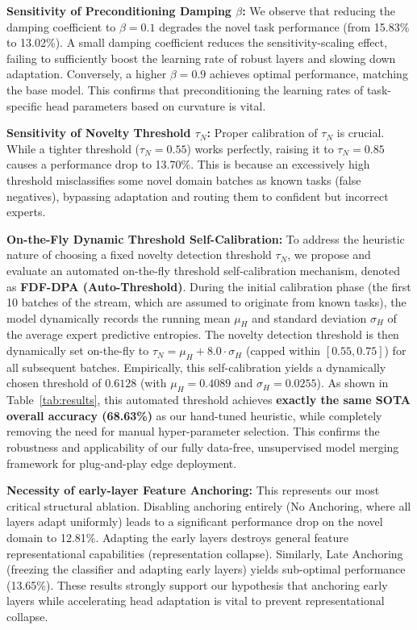 \documentclass{article}
\theoremstyle{plain}
\theoremstyle{definition}
\theoremstyle{remark}
\begin{document}
\textbf{Sensitivity of Preconditioning Damping $\beta$:} We observe that reducing the damping coefficient to $\beta = 0.1$ degrades the novel task performance (from 15.83\% to 13.02\%). A small damping coefficient reduces the sensitivity-scaling effect, failing to sufficiently boost the learning rate of robust layers and slowing down adaptation. Conversely, a higher $\beta = 0.9$ achieves optimal performance, matching the base model. This confirms that preconditioning the learning rates of task-specific head parameters based on curvature is vital.

\textbf{Sensitivity of Novelty Threshold $\tau_N$:} Proper calibration of $\tau_N$ is crucial. While a tighter threshold ($\tau_N = 0.55$) works perfectly, raising it to $\tau_N = 0.85$ causes a performance drop to 13.70\%. This is because an excessively high threshold misclassifies some novel domain batches as known tasks (false negatives), bypassing adaptation and routing them to confident but incorrect experts.

\textbf{On-the-Fly Dynamic Threshold Self-Calibration:} To address the heuristic nature of choosing a fixed novelty detection threshold $\tau_N$, we propose and evaluate an automated on-the-fly threshold self-calibration mechanism, denoted as \textbf{FDF-DPA (Auto-Threshold)}. During the initial calibration phase (the first 10 batches of the stream, which are assumed to originate from known tasks), the model dynamically records the running mean $\mu_H$ and standard deviation $\sigma_H$ of the average expert predictive entropies. The novelty detection threshold is then dynamically set on-the-fly to $\tau_N = \mu_H + 8.0 \cdot \sigma_H$ (capped within $[0.55, 0.75]$) for all subsequent batches. Empirically, this self-calibration yields a dynamically chosen threshold of $0.6128$ (with $\mu_H = 0.4089$ and $\sigma_H = 0.0255$). As shown in Table~\ref{tab:results}, this automated threshold achieves \textbf{exactly the same SOTA overall accuracy (68.63\%)} as our hand-tuned heuristic, while completely removing the need for manual hyper-parameter selection. This confirms the robustness and applicability of our fully data-free, unsupervised model merging framework for plug-and-play edge deployment.

\textbf{Necessity of early-layer Feature Anchoring:} This represents our most critical structural ablation. Disabling anchoring entirely (No Anchoring, where all layers adapt uniformly) leads to a significant performance drop on the novel domain to 12.81\%. Adapting the early layers destroys general feature representational capabilities (representation collapse). Similarly, Late Anchoring (freezing the classifier and adapting early layers) yields sub-optimal performance (13.65\%). These results strongly support our hypothesis that anchoring early layers while accelerating head adaptation is vital to prevent representational collapse.
\end{document}

